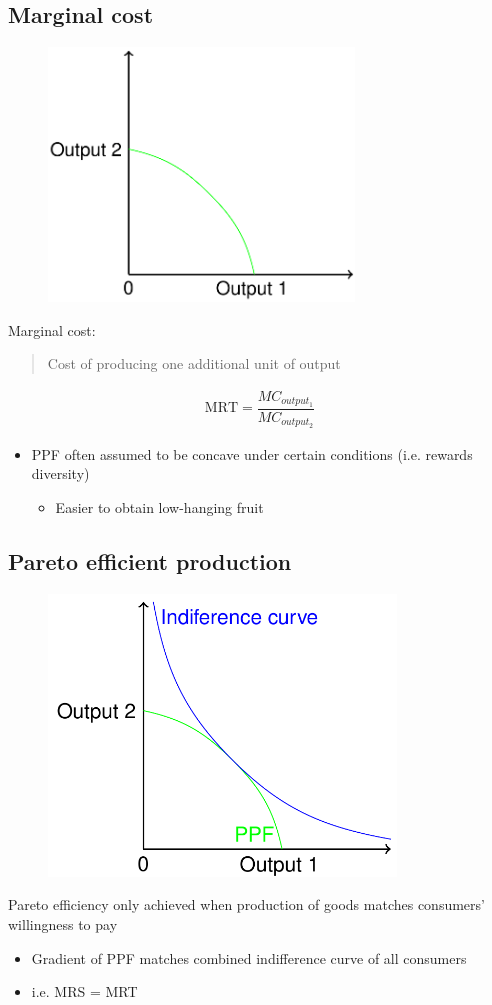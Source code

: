 \subsection{Marginal cost}
\begin{figure}[H]
  \centering
  \includegraphics[width =0.5 \textwidth]{./img/figure8.png}
  \caption{}
\end{figure}
Marginal cost:
\begin{quote}
  Cost of producing one additional unit of output
\end{quote}
\begin{gather}
  \textrm{MRT} = \dfrac{MC_{output_1}}{MC_{output_2}}
\end{gather}
\begin{itemize}
  \item PPF often assumed to be concave under certain conditions (i.e. rewards diversity)
        \begin{itemize}
          \item Easier to obtain low-hanging fruit
        \end{itemize}
\end{itemize}
\subsection{Pareto efficient production}
\begin{figure}[H]
  \centering
  \includegraphics[width =0.5 \textwidth]{./img/figure9.png}
  \caption{}
\end{figure}
Pareto efficiency only achieved when production of goods matches consumers' willingness to pay
\begin{itemize}
  \item Gradient of PPF matches combined indifference curve of all consumers
  \item i.e. MRS = MRT
\end{itemize}
